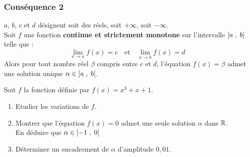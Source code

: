  \subsubsection*{Conséquence 2}
 $ a$, $b$,  $c $  et $ d$ désignent soit des réels, soit $ +\infty $, soit $ -\infty. $\\
  Soit $ f $ une fonction \textbf{\color{magenta}continue et strictement monotone} sur  l'intervalle $ \left]a \;,\; b\right[ $ telle que :
   \[\displaystyle \lim_{x \to a}f(x)=c \quad \textrm{et}\quad \displaystyle\lim_{x \to b}f(x)=d\]
Alors pour tout nombre réel $ \beta $ compris entre $c $ et $d $, l'équation $ f(x)=\beta $ admet une solution  unique $ \alpha \in \left]a \;,\; b\right[ $.\\

\begin{exercice}
Soit $ f $ la fonction définie par $ f(x)= x^{3}+x+1 $.
 \begin{enumerate}
\item Etudier les variations  de $ f $.
\item Montrer que  l'équation $ f(x)=0 $ admet une seule solution $ \alpha$ dans $\mathbb{R} $.\\ En déduire que $ \alpha\in\left]-1 \;,\; 0\right[ $
\item  Déterminer un encadrement de $ \alpha $ d'amplitude $ 0,01 $.
\end{enumerate}
\end{exercice}
